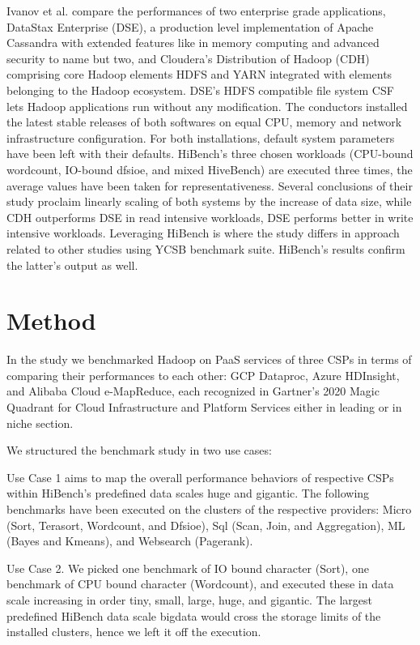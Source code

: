 \documentclass[review]{elsarticle}
\begin{document}
Ivanov et al. \cite{ivanov_performance_2015} compare the performances of two enterprise grade applications, DataStax Enterprise (DSE), a production level implementation of Apache Cassandra with extended features like in memory computing and advanced security to name but two, and Cloudera’s Distribution of Hadoop (CDH) comprising core Hadoop elements HDFS and YARN integrated with elements belonging to the Hadoop ecosystem. DSE’s HDFS compatible file system CSF lets Hadoop applications run without any modification. The conductors installed the latest stable releases of both softwares on equal CPU, memory and network infrastructure configuration. For both installations, default system parameters have been left with their defaults. HiBench’s three chosen workloads (CPU-bound wordcount, IO-bound dfsioe, and mixed HiveBench) are executed three times, the average values have been taken for representativeness. Several conclusions of their study proclaim linearly scaling of both systems by the increase of data size, while CDH outperforms DSE in read intensive workloads, DSE performs better in write intensive workloads. Leveraging HiBench is where the study differs in approach related to other studies using YCSB benchmark suite. HiBench’s results confirm the latter’s output as well.




\section{Method}


In the study we benchmarked Hadoop on PaaS services of three CSPs in terms of comparing their performances to each other: GCP Dataproc, Azure HDInsight, and Alibaba Cloud e-MapReduce, each recognized in Gartner's 2020 Magic Quadrant for Cloud Infrastructure and Platform Services \cite{noauthor_gartner_nodate} either in leading or in niche section.

We structured the benchmark study in two use cases: 

Use Case 1 aims to map the overall performance behaviors of respective CSPs within HiBench's predefined data scales huge and gigantic. The following benchmarks have been executed on the clusters of the respective providers: Micro (Sort, Terasort, Wordcount, and Dfsioe), Sql (Scan, Join, and Aggregation), ML (Bayes and Kmeans), and Websearch (Pagerank).

Use Case 2. We picked one benchmark of IO bound character (Sort), one benchmark of CPU bound character (Wordcount), and executed these in data scale increasing  in order tiny, small, large, huge, and gigantic. The largest predefined HiBench data scale bigdata would cross the storage limits of the installed clusters, hence we left it off the execution. 
\end{document}
